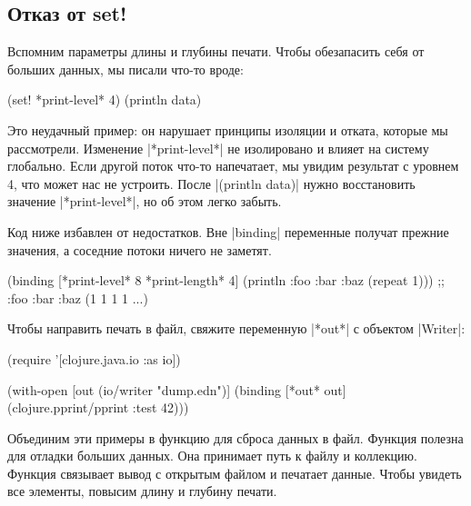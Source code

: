 \subsection{Отказ от set!}

Вспомним параметры длины и глубины печати. Чтобы обезапасить себя от больших
данных, мы писали что-то вроде:

\begin{english}
  \begin{clojure}
(set! *print-level* 4)
(println data)
  \end{clojure}
\end{english}


Это неудачный пример: он нарушает принципы изоляции и отката, которые мы
рассмотрели. Изменение \spverb|*print-level*| не изолировано и влияет на систему
глобально. Если другой поток что-то напечатает, мы увидим результат с уровнем 4,
что может нас не устроить. После \spverb|(println data)| нужно
восстановить значение \spverb|*print-level*|, но об этом легко забыть.

Код ниже избавлен от недостатков. Вне \spverb|binding| переменные получат
прежние значения, а соседние потоки ничего не заметят.

\begin{english}
  \begin{clojure}
(binding [*print-level* 8
          *print-length* 4]
  (println {:foo {:bar {:baz (repeat 1)}}}))
;; {:foo {:bar {:baz (1 1 1 1 ...)}}}
  \end{clojure}
\end{english}


Чтобы направить печать в файл, свяжите переменную \spverb|*out*| с объектом
\spverb|Writer|:

\begin{english}
  \begin{clojure}
(require '[clojure.java.io :as io])

(with-open [out (io/writer "dump.edn")]
  (binding [*out* out]
    (clojure.pprint/pprint {:test 42})))
  \end{clojure}
\end{english}

Объединим эти примеры в функцию для сброса данных в файл. Функция полезна для
отладки больших данных. Она принимает путь к файлу и коллекцию. Функция
связывает вывод с открытым файлом и печатает данные. Чтобы увидеть все элементы,
повысим длину и глубину печати.

